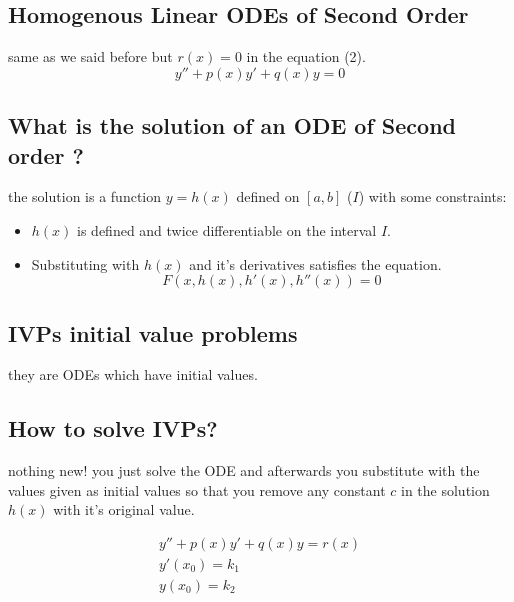 \documentclass[11pt]{article}
\theoremstyle{definition}
\begin{document}
\subsection{Homogenous Linear ODEs of Second Order}

same as we said before but $r(x)=0$ in the equation (2).
\begin{equation}
\label{H}
    y''+p(x)y'+q(x)y=0
\end{equation}

\subsection{What  is the solution of an ODE of Second order ?}
the solution is a function $y=h(x)$ defined on $[a,b]$ ($I$) with some constraints: 
\begin{itemize}
    \item $h(x)$ is defined and twice differentiable on the interval $I$.
    \item Substituting with $h(x)$ and it's derivatives satisfies the equation.
    \begin{equation}
        F(x, h(x), h'(x), h''(x)) = 0
    \end{equation}
    
\end{itemize}

\subsection{IVPs initial value problems}

they are ODEs which have initial values.

\subsection{How to solve IVPs?}
nothing new! you just solve the ODE and afterwards you substitute with the values given as initial values so that you remove any constant $c$ in the solution $h(x)$ with it's original value. 
\begin{shaded}
\begin{equation} 
\begin{split} 
  y''+p(x)y'+q(x)y=r(x) \\
  y'(x_0) = k_1 \\
  y(x_0) = k_2\\
  \end{split} 
\end{equation}
\end{shaded}
\end{document}
